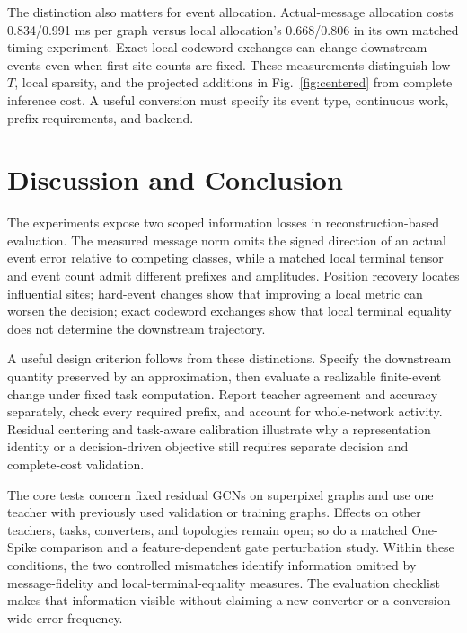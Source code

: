 \documentclass[10pt,twocolumn,letterpaper]{article}
\begin{document}
The distinction also matters for event allocation. Actual-message allocation costs 0.834/0.991 ms per graph versus local allocation's 0.668/0.806 in its own matched timing experiment. Exact local codeword exchanges can change downstream events even when first-site counts are fixed. These measurements distinguish low $T$, local sparsity, and the projected additions in Fig.~\ref{fig:centered} from complete inference cost. A useful conversion must specify its event type, continuous work, prefix requirements, and backend.

\section{Discussion and Conclusion}
The experiments expose two scoped information losses in reconstruction-based evaluation. The measured message norm omits the signed direction of an actual event error relative to competing classes, while a matched local terminal tensor and event count admit different prefixes and amplitudes. Position recovery locates influential sites; hard-event changes show that improving a local metric can worsen the decision; exact codeword exchanges show that local terminal equality does not determine the downstream trajectory.

A useful design criterion follows from these distinctions. Specify the downstream quantity preserved by an approximation, then evaluate a realizable finite-event change under fixed task computation. Report teacher agreement and accuracy separately, check every required prefix, and account for whole-network activity. Residual centering and task-aware calibration illustrate why a representation identity or a decision-driven objective still requires separate decision and complete-cost validation.

The core tests concern fixed residual GCNs on superpixel graphs and use one teacher with previously used validation or training graphs. Effects on other teachers, tasks, converters, and topologies remain open; so do a matched One-Spike comparison and a feature-dependent gate perturbation study. Within these conditions, the two controlled mismatches identify information omitted by message-fidelity and local-terminal-equality measures. The evaluation checklist makes that information visible without claiming a new converter or a conversion-wide error frequency.

\clearpage
\end{document}
